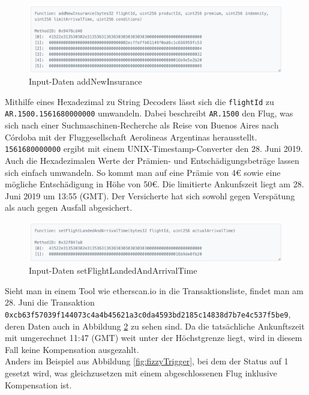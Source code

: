 \begin{figure}[h!]
  \centering
  \includegraphics[width=\textwidth]{Bilder/FizzyExampleNewInsurance.png}
  \caption[Input-Daten addNewInsurance]{Input-Daten addNewInsurance \cite{FizzyNewInsurance2019}}
  \label{fig:fizzyNewInsurance}
\end{figure}

Mithilfe eines Hexadezimal zu String Decoders lässt sich die \texttt{flightId} zu \\ \texttt{AR.1500.1561680000000} umwandeln. Dabei beschreibt \texttt{AR.1500} den Flug, was sich nach einer Suchmaschinen-Recherche als Reise von Buenos Aires nach Córdoba mit der Fluggesellschaft Aerolineas Argentinas herausstellt. \texttt{1561680000000} ergibt mit einem UNIX-Timestamp-Converter den 28. Juni 2019. Auch die Hexadezimalen Werte der Prämien- und Entschädigungsbeträge lassen sich einfach umwandeln. So kommt man auf eine Prämie von 4€ sowie eine mögliche Entschädigung in Höhe von 50€. Die limitierte Ankunfszeit liegt am 28. Juni 2019 um 13:55 (GMT). Der Versicherte hat sich sowohl gegen Verspätung als auch gegen Ausfall abgesichert.

\begin{figure}[h!]
  \centering
  \includegraphics[width=\textwidth]{Bilder/FizzyExampleFlightLanded.png}
  \caption[Input-Daten setFlightLandedAndArrivalTime]{Input-Daten setFlightLandedAndArrivalTime \cite{FizzyFlightLanded2019}}
  \label{fig:fizzyFlightLanded}
\end{figure}

Sieht man in einem Tool wie etherscan.io in die Transaktionsliste, findet man am 28. Juni die Transaktion \texttt{0xcb63f57039f144073c4a4b45621a3c0da4593bd2185c14838d7b7e4c537f5be9}, deren Daten auch in Abbildung \ref{fig:fizzyFlightLanded} zu sehen sind. Da die tatsächliche Ankunftszeit mit umgerechnet 11:47 (GMT) weit unter der Höchstgrenze liegt, wird in diesem Fall keine Kompensation ausgezahlt.\\
Anders im Beispiel aus Abbildung \ref{fig:fizzyTrigger}, bei dem der Status auf 1 gesetzt wird, was gleichzusetzen mit einem abgeschlossenen Flug inklusive Kompensation ist.

